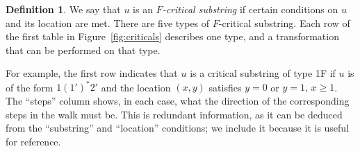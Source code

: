 \documentclass[10pt]{amsart}
\theoremstyle{definition}
\newtheorem{defi}[theorem]{Definition}
\newcommand{\defn}[1]{\emph{#1}}
\begin{document}
\begin{defi} We say that $u$ is an \defn{$F$-critical substring} if certain conditions on $u$ and its location are met. There are five types of $F$-critical substring. Each row of the first table in Figure~\ref{fig:criticals} describes one type, and a transformation that can be performed on that type.

%
For example, the first row indicates that $u$ is a critical substring of type 1F if $u$ is of the form $1(1')^*2'$ and the location $(x,y)$ satisfies $y=0$ or $y=1,\, x \geq 1$. The ``steps'' column shows, in each case, what the direction of the corresponding steps in the walk must be. This is redundant information, as it can be deduced from the ``substring'' and ``location'' conditions; we include it because it is useful for reference.

\end{defi} 
\end{document}
